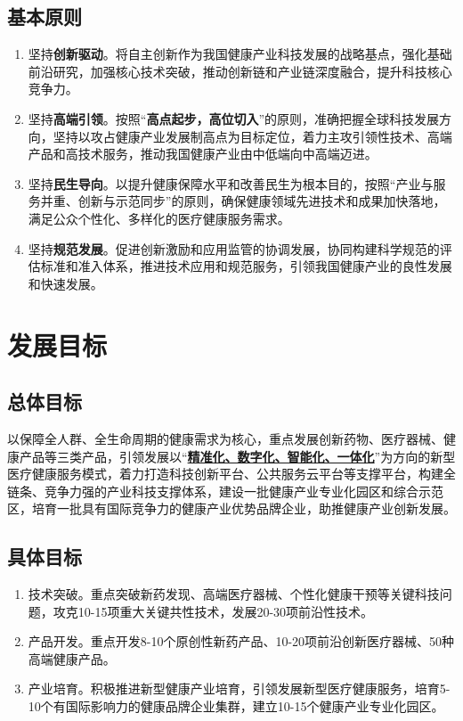 \documentclass{article}
\begin{document}
\subsection{基本原则}

\begin{enumerate}
	\item 坚持\textbf{创新驱动}。将自主创新作为我国健康产业科技发展的战略基点，强化基础前沿研究，加强核心技术突破，推动创新链和产业链深度融合，提升科技核心竞争力。
	\item 坚持\textbf{高端引领}。按照“\textbf{高点起步，高位切入}”的原则，准确把握全球科技发展方向，坚持以攻占健康产业发展制高点为目标定位，着力主攻引领性技术、高端产品和高技术服务，推动我国健康产业由中低端向中高端迈进。
	\item 坚持\textbf{民生导向}。以提升健康保障水平和改善民生为根本目的，按照“产业与服务并重、创新与示范同步”的原则，确保健康领域先进技术和成果加快落地，满足公众个性化、多样化的医疗健康服务需求。
	\item 坚持\textbf{规范发展}。促进创新激励和应用监管的协调发展，协同构建科学规范的评估标准和准入体系，推进技术应用和规范服务，引领我国健康产业的良性发展和快速发展。
\end{enumerate}

\section{发展目标}

\subsection{总体目标}

以保障全人群、全生命周期的健康需求为核心，重点发展创新药物、医疗器械、健康产品等三类产品，引领发展以“\textbf{\uline{精准化、数字化、智能化、一体化}}”为方向的新型医疗健康服务模式，着力打造科技创新平台、公共服务云平台等支撑平台，构建全链条、竞争力强的产业科技支撑体系，建设一批健康产业专业化园区和综合示范区，培育一批具有国际竞争力的健康产业优势品牌企业，助推健康产业创新发展。

\subsection{具体目标}

\begin{enumerate}
	\item 技术突破。重点突破新药发现、高端医疗器械、个性化健康干预等关键科技问题，攻克10-15项重大关键共性技术，发展20-30项前沿性技术。
	\item 产品开发。重点开发8-10个原创性新药产品、10-20项前沿创新医疗器械、50种高端健康产品。
	\item 产业培育。积极推进新型健康产业培育，引领发展新型医疗健康服务，培育5-10个有国际影响力的健康品牌企业集群，建立10-15个健康产业专业化园区。
\end{enumerate}
\end{document}
